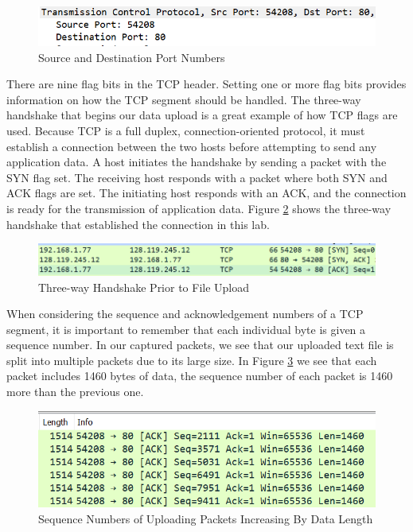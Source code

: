 \documentclass[10pt]{IEEEtran}
\begin{document}
  \begin{figure}[h!]
	\includegraphics[width=\linewidth]{portnumbers.png}
	\caption{Source and Destination Port Numbers }
	\label{fig:TCPPortNumbers}
\end{figure}

 There are nine flag bits in the TCP header. Setting one or more flag bits provides information on how the TCP segment should be handled. The three-way handshake that begins our data upload is a great example of how TCP flags are used. Because TCP is a full duplex, connection-oriented protocol, it must establish a connection between the two hosts before attempting to send any application data. A host initiates the handshake by sending a packet with the SYN flag set. The receiving host responds with a packet where both SYN and ACK flags are set. The initiating host responds with an ACK, and the connection is ready for the transmission of application data. Figure \ref{fig:threewayhandshake} shows the three-way handshake that established the connection in this lab.\\
 
    \begin{figure}[h!]
	\includegraphics[width=\linewidth]{threewayhandshake.png}
	\caption{Three-way Handshake Prior to File Upload}
	\label{fig:threewayhandshake}
\end{figure}
 
 When considering the sequence and acknowledgement numbers of a TCP segment, it is important to remember that each individual byte is given a sequence number. In our captured packets, we see that our uploaded text file is split into multiple packets due to its large size. In Figure \ref{fig:tcpsequence} we see that each packet includes 1460 bytes of data, the sequence number of each packet is 1460 more than the previous one.\\
 
\begin{figure}[h!]
	\includegraphics[width=\linewidth]{tcpsequence.png}
	\caption{Sequence Numbers of Uploading Packets Increasing By Data Length}
	\label{fig:tcpsequence}
	\end{figure}
	
\end{document}

